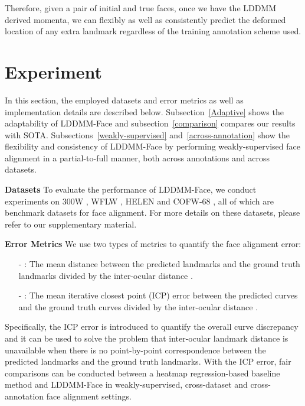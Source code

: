\documentclass[10pt,twocolumn,letterpaper]{article}
\begin{document}
Therefore, given a pair of initial and true faces, once we have the LDDMM derived momenta, we can flexibly as well as consistently predict the deformed location of any extra landmark regardless of the training annotation scheme used. 

\section{Experiment}
In this section, the employed datasets and error metrics as well as implementation details are described below. Subsection~\ref{Adaptive} shows the adaptability of LDDMM-Face and subsection~\ref{comparison} compares our results with SOTA. Subsections~\ref{weakly-supervised} and~\ref{across-annotation} show the flexibility and consistency of LDDMM-Face by performing weakly-supervised face alignment in a partial-to-full manner, both across annotations and across datasets.

\textbf{Datasets} To evaluate the performance of LDDMM-Face, we conduct experiments on 300W \cite{sagonas2013300}, WFLW \cite{Wu_2018_CVPR}, HELEN \cite{le2012interactive} and COFW-68 \cite{burgos2013robust, ghiasi2015occlusion}, all of which are benchmark datasets for face alignment. For more details on these datasets, please refer to our supplementary material.





\textbf{Error Metrics} We use two types of metrics to quantify the face alignment error: 

\begin{itemize}
\item[-] : The mean distance between the predicted landmarks and the ground truth landmarks divided by the inter-ocular distance \cite{ren2014face,zhu2015face,xiao2016robust}.

\item[-] : The mean iterative closest point (ICP) error between the predicted curves and the ground truth curves divided by the inter-ocular distance \cite{arun1987least}. 
\end{itemize}

Specifically, the ICP error is introduced to quantify the overall curve discrepancy and it can be used to solve the problem that inter-ocular landmark distance is unavailable when there is no point-by-point correspondence between the predicted landmarks and the ground truth landmarks. With the ICP error, fair comparisons can be conducted between a heatmap regression-based baseline method and LDDMM-Face in weakly-supervised, cross-dataset and cross-annotation face alignment settings.
\end{document}
